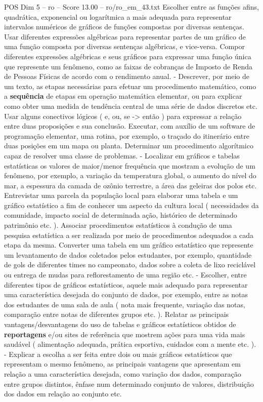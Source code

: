 \begin{textsample}{POS Dim 5 – ro – Score 13.00 – ro/ro\_em\_43.txt}
Escolher entre as funções afins, quadrática, exponencial ou logarítmica a mais adequada para representar intervalos numéricos de gráficos de funções compostas por diversas sentenças.
Usar diferentes expressões algébricas para representar partes de um gráfico de uma função composta por diversas sentenças algébricas, e vice-versa.
Compor diferentes expressões algébricas e seus gráficos para expressar uma função única que represente um fenômeno, como as faixas de cobranças de Imposto de Renda de Pessoas Físicas de acordo com o rendimento anual. - Descrever, por meio de um texto, as etapas necessárias para efetuar um procedimento matemático, como a \textbf{sequência} de etapas em operação matemática elementar, ou para explicar como obter uma medida de tendência central de uma série de dados discretos etc.
Usar alguns conectivos lógicos ( e, ou, se -> então ) para expressar a relação entre duas proposições e sua conclusão.
Executar, com auxílio de um software de programação elementar, uma rotina, por exemplo, o traçado do itinerário entre duas posições em um mapa ou planta.
Determinar um procedimento algorítmico capaz de resolver uma classe de problemas. - Localizar em gráficos e tabelas estatísticas os valores de maior/menor frequência que mostram a evolução de um fenômeno, por exemplo, a variação da temperatura global, o aumento do nível do mar, a espessura da camada de ozônio terrestre, a área das geleiras dos polos etc.
Entrevistar uma parcela da população local para elaborar uma tabela e um gráfico estatístico a fim de conhecer um aspecto da cultura local ( necessidades da comunidade, impacto social de determinada ação, histórico de determinado patrimônio etc. ).
Associar procedimentos estatísticos à condução de uma pesquisa estatística a ser realizada por meio de procedimentos adequados a cada etapa da mesma.
Converter uma tabela em um gráfico estatístico que represente um levantamento de dados coletados pelos estudantes, por exemplo, quantidade de gols de diferentes times no campeonato, dados sobre a coleta de lixo reciclável ou entrega de mudas para reflorestamento de uma região etc. - Escolher, entre diferentes tipos de gráficos estatísticos, aquele mais adequado para representar uma característica desejada do conjunto de dados, por exemplo, entre as notas dos estudantes de uma sala de aula ( nota mais frequente, variação das notas, comparação entre notas de diferentes grupos etc. ).
Relatar as principais vantagens/desvantagens do uso de tabelas e gráficos estatísticos obtidos de \textbf{reportagens} e/ou sites de referência que mostrem ações para uma vida mais saudável ( alimentação adequada, prática esportiva, cuidados com a mente etc. ). - Explicar a escolha a ser feita entre dois ou mais gráficos estatísticos que representam o mesmo fenômeno, as principais vantagens que apresentam em relação a uma característica desejada, como variação dos dados, comparação entre grupos distintos, ênfase num determinado conjunto de valores, distribuição dos dados em relação ao conjunto etc.

\end{textsample}
